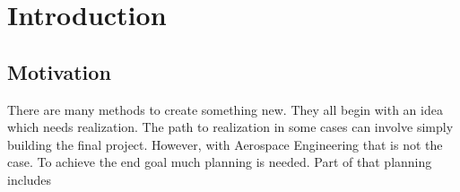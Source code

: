 \chapter{Introduction}
\section{Motivation}
There are many methods to create something new. They all begin with an idea which needs realization. The path to realization in some cases can involve simply building the final project. However, with Aerospace Engineering that is not the case. To achieve the end goal much planning is needed. Part of that planning includes 